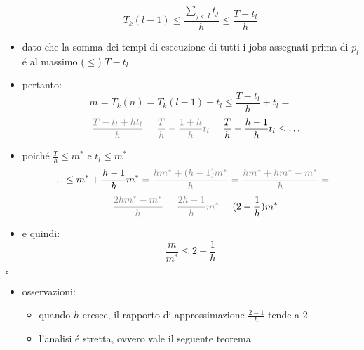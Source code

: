 \begin{flushleft}
\begin{itemize}
			$$T_k(l-1)\leq\frac{\sum_{j<l}t_j}{h}\leq\frac{T-t_l}{h}$$
		\item dato che la somma dei tempi di esecuzione di tutti i jobs assegnati prima di $p_l$ \'e al massimo ($\leq$) $T-t_l$
		\item pertanto:
			$$m=T_k(n)=T_k(l-1)+t_l\leq\frac{T-t_l}{h}+t_l=$$
			$$=\color{gray}\frac{T-t_l+ht_l}{h}=\frac{T}{h}-\frac{1+h}{h}t_l\color{black}=\frac{T}{h}+\frac{h-1}{h}t_l\leq\ldots$$
		\item poich\'e $\frac{T}{h}\leq m^*$ e $t_l\leq m^*$
			$$\ldots\leq m^*+\frac{h-1}{h}m^*\color{gray}=\frac{hm^*+(h-1)m^*}{h}=\frac{hm^*+hm^*-m^*}{h}=$$
			$$\color{gray}=\frac{2hm^*-m^*}{h}=\frac{2h-1}{h}m^*\color{black}=(2-\frac{1}{h})m^*$$
		\item e quindi:
			$$\frac{m}{m^*}\leq 2-\frac{1}{h}$$
	\end{itemize}
	\hfill$\square$
	\begin{itemize}
		\item osservazioni:
		\begin{itemize}
			\item quando $h$ cresce, il rapporto di approssimazione $\frac{2-1}{h}$ tende a $2$
			\item l'analisi \'e stretta, ovvero vale il seguente teorema
		\end{itemize}
	\end{itemize}
\end{flushleft}


